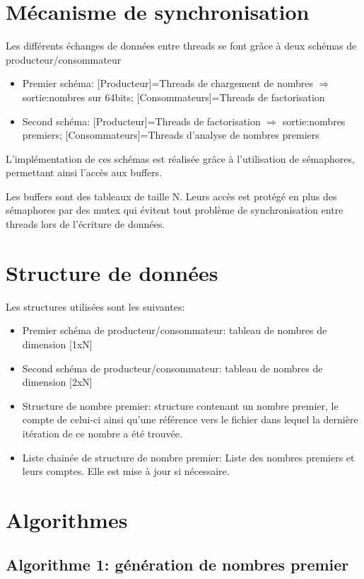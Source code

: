\documentclass[11pt,a4paper]{article}
\begin{document}
\section{Mécanisme de synchronisation}
Les différents échanges de données entre threads se font grâce à deux schémas de producteur/consommateur 

\begin{itemize}
\item{Premier schéma: [Producteur]=Threads de chargement de nombres $\Rightarrow$ sortie:nombres sur 64bits; [Consommateurs]=Threads de factorisation}
\item{Second schéma: [Producteur]=Threads de factorisation $\Rightarrow$ sortie:nombres premiers; [Consommateurs]=Threads d'analyse de nombres premiers}
\end{itemize}

L'implémentation de ces schémas est réalisée grâce à l'utilisation de sémaphores, permettant ainsi l'accès aux buffers.

Les buffers sont des tableaux de taille N. Leurs accès est protégé en plus des sémaphores par des mutex qui évitent tout problème de synchronisation entre threads lors de l'écriture de données.

\section{Structure de données}
Les structures utilisées sont les suivantes:

\begin{itemize}
\item{Premier schéma de producteur/consommateur: tableau de nombres de dimension [1xN]}
\item{Second schéma de producteur/consommateur: tableau de nombres de dimension [2xN]}
\item{Structure de nombre premier: structure contenant un nombre premier, le compte de celui-ci ainsi qu'une référence vers le fichier dans lequel la dernière itération de ce nombre a été trouvée.}
\item{Liste chainée de structure de nombre premier: Liste des nombres premiers et leurs comptes. Elle est mise à jour si nécessaire.}
\end{itemize}


\section{Algorithmes}
 \subsection{Algorithme 1: génération de nombres premier}
 
\end{document}
